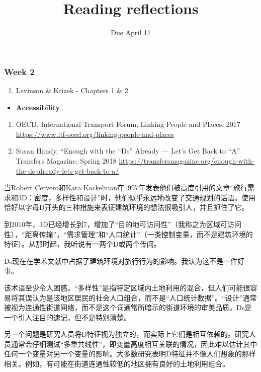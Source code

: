 \documentclass[12pt,]{article}
\title{Reading reflections}
\author{}
\date{Due April 11}
\providecommand{\tightlist}{%
  \setlength{\itemsep}{0pt}\setlength{\parskip}{0pt}}
\begin{document}
\maketitle

\hypertarget{section}{%
\subsubsection{\texorpdfstring{\textcolor[rgb]{0.7,0.7,0.7}{Week 2}}{}}\label{section}}

\begin{enumerate}
\def\labelenumi{\arabic{enumi}.}
\tightlist
\item
  Levinson \& Krizek - Chapters 1 \& 2
\end{enumerate}

\begin{itemize}
\tightlist
\item
  \textbf{Accessibility}
\end{itemize}

\begin{enumerate}
\def\labelenumi{\arabic{enumi}.}
\setcounter{enumi}{1}
\item
  OECD, International Transport Forum, Linking People and Places, 2017
  \url{https://www.itf-oecd.org/linking-people-and-places}
\item
  Susan Handy, ``Enough with the ``Ds'' Already --- Let's Get Back to
  ``A'' Transfers Magazine, Spring 2018
  \url{https://transfersmagazine.org/enough-with-the-ds-already-lets-get-back-to-a/}
\end{enumerate}

当Robert Cervero和Kara
Kockelman在1997年发表他们被高度引用的文章``旅行需求和3D：密度，多样性和设计''时，他们似乎永远地改变了交通规划的话语。使用恰好以字母D开头的三种措施来表征建筑环境的想法很吸引人，并且抓住了它。

到2010年，3D已经增长到7，增加了``目的地可访问性''（我称之为区域可访问性），``距离传输''，``需求管理''和``人口统计''（一类控制变量，而不是建筑环境的特征）。从那时起，我听说有一两个D或两个传闻。

Ds现在在学术文献中占据了建筑环境对旅行行为的影响。我认为这不是一件好事。

该术语至少令人困惑。``多样性''是指特定区域内土地利用的混合，但人们可能很容易将其误认为是该地区居民的社会人口组合，而不是``人口统计数据''。``设计''通常被视为连通性街道网络，而不是这个词通常所暗示的街道环境的审美品质。Ds是一个引人注目的速记，但不是特别清楚。

另一个问题是研究人员将D特征视为独立的，而实际上它们是相互依赖的。研究人员通常会仔细测试``多重共线性''，即变量高度相互关联的情况，因此难以估计其中任何一个变量对另一个变量的影响。大多数研究表明D特征并不像人们想象的那样相关。例如，有可能在街道连通性较低的地区拥有良好的土地利用组合。
\end{document}
